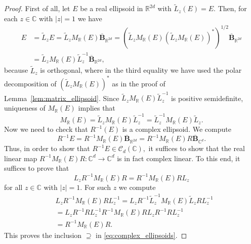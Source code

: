 \documentclass[10pt,a4paper]{amsart}
\newcommand{\complex}{\mathbb{C}}
\newcommand{\reals}{\mathbb{R}}
\begin{document}
\begin{proof}
     First of all, let $E$ be a real ellipsoid in $\reals^{2d}$  with $\widetilde{L}_{z}(E)=E$. Then, for each $z\in\complex$ with $|z|=1$ we have
     \begin{align*}
     	E&=\widetilde{L}_{z}E=\widetilde{L}_{z}M_{\reals}(E)\mathbf{\overline{B}}_{\reals^{2d}}
        =(\widetilde{L}_{z}M_{\reals}(E)(\widetilde{L}_{z}M_{\reals}(E))^{*})^{1/2}\mathbf{\overline{B}}_{\reals^{2d}}\\
     	&=\widetilde{L}_{z}M_{\reals}(E)\widetilde{L}_{z}^{-1}\mathbf{\overline{B}}_{\reals^{2d}},
     \end{align*}
     because $\widetilde{L}_{z}$ is orthogonal, where in the third equality we have used the polar decomposition of $(\widetilde{L}_{z}M_{\reals}(E))^{*}$ as in the proof of Lemma~\ref{lem:matrix_ellipsoid}. Since $\widetilde{L}_{z}M_{\reals}(E)\widetilde{L}_{z}^{-1}$ is positive semidefinite, uniqueness of $M_{\reals}(E)$ implies that
     \begin{equation*}
     	M_{\reals}(E) = \widetilde{L}_{z}M_{\reals}(E)\widetilde{L}_{z}^{-1} = \widetilde{L}_{z}^{-1}M_{\reals}(E)\widetilde{L}_{z}.
     \end{equation*}
     Now we need to check that $R^{-1}(E)$ is a complex ellipsoid. We compute
     \begin{equation*}
     	R^{-1}E = R^{-1}M_{\reals}(E)\mathbf{\overline{B}}_{\reals^{2d}} = R^{-1}M_{\reals}(E)R\mathbf{\overline{B}}_{\complex^{d}}.
     \end{equation*}
     Thus, in order to show that $R^{-1}E\in\mathcal{C}_{d}(\complex),$ it suffices to show that the real linear map $R^{-1}M_{\reals}(E)R:\complex^{d}\to\complex^{d}$ is in fact complex linear. To this end, it suffices to prove that
     \begin{equation*}
     	L_{z}R^{-1}M_{\reals}(E)R = R^{-1}M_{\reals}(E)RL_{z}
     \end{equation*}
     for all $z\in\complex$ with $|z|=1$. For such $z$ we compute
     \begin{align*}
     	&L_{z}R^{-1}M_{\reals}(E)RL_{z}^{-1}=L_{z}R^{-1}\widetilde{L}_{z}^{-1}M_{\reals}(E)\widetilde{L}_{z}RL_{z}^{-1}\\
     	&=L_{z}R^{-1}RL_{z}^{-1}R^{-1}M_{\reals}(E)RL_{z}R^{-1}RL_{z}^{-1}\\
     	&=R^{-1}M_{\reals}(E)R.
     \end{align*}
	This proves the inclusion $\supseteq$ in \eqref{eq:complex_ellipsoids}.
	

\end{proof}
\end{document}
